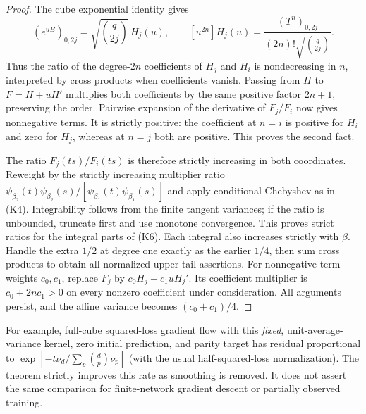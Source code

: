 \documentclass[11pt]{article}
\begin{document}
\begin{proof}
The cube exponential identity gives
\[
 (e^{uB})_{0,2j}=\sqrt{\binom q{2j}}\,H_j(u),\qquad
 [u^{2n}]H_j(u)=
       \frac{(T^n)_{0,2j}}{(2n)!\sqrt{\binom q{2j}}}.     \tag{K8}
\]
Thus the ratio of the degree-$2n$ coefficients of $H_j$ and $H_i$
is nondecreasing in $n$, interpreted by cross products when coefficients
vanish. Passing from $H$ to $F=H+uH'$ multiplies both coefficients
by the same positive factor $2n+1$, preserving the order.
Pairwise expansion of the derivative of $F_j/F_i$ now gives
nonnegative terms. It is strictly positive: the coefficient at $n=i$
is positive for $H_i$ and zero for $H_j$, whereas at $n=j$ both
are positive. This proves the second fact.

The ratio $F_j(ts)/F_i(ts)$ is therefore strictly increasing in both
coordinates. Reweight by the strictly increasing multiplier ratio
$\psi_{\beta_2}(t)\psi_{\beta_2}(s)/
 [\psi_{\beta_1}(t)\psi_{\beta_1}(s)]$ and apply conditional Chebyshev
as in (K4). Integrability follows from the finite tangent variances;
if the ratio is unbounded, truncate first and use monotone convergence.
This proves strict ratios for the integral parts of (K6).
Each integral also increases strictly with $\beta$. Handle the extra
$1/2$ at degree one exactly as the earlier $1/4$, then sum cross
products to obtain all normalized upper-tail assertions.
For nonnegative term weights $c_0,c_1$, replace $F_j$ by
$c_0H_j+c_1uH_j'$. Its coefficient multiplier is $c_0+2nc_1>0$
on every nonzero coefficient under consideration. All arguments persist,
and the affine variance becomes $(c_0+c_1)/4$.
\end{proof}
For example, full-cube squared-loss gradient flow with this
\emph{fixed}, unit-average-variance kernel, zero initial prediction,
and parity target has residual proportional to
$\exp[-t\nu_d/\sum_p\binom dp\nu_p]$ (with the usual half-squared-loss
normalization). The theorem strictly improves this rate as smoothing
is removed. It does not assert the same comparison for finite-network
gradient descent or partially observed training.
\end{document}

